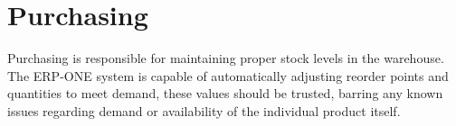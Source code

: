 \section{Purchasing}

Purchasing is responsible for maintaining proper stock levels in the warehouse.  The ERP-ONE system is capable of automatically adjusting reorder points and quantities to meet demand, these values should be trusted, barring any known issues regarding demand or availability of the individual product itself.